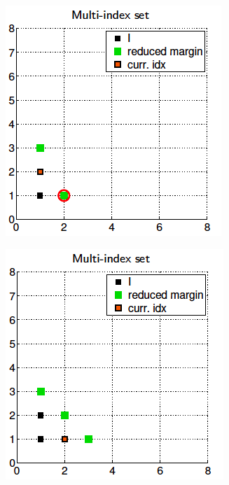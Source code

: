 \begin{figure}[htb]
\begin{subfigure}{0.165\textwidth}
 		\caption{}
 		\label{fig:4}
 	\end{subfigure}\hfil %
 	\begin{subfigure}{0.165\textwidth}
 		\includegraphics[width=\linewidth]{./figures/MISC_construction/5}
 		\caption{}
 		\label{fig:5}
 	\end{subfigure}\hfil %
 	\begin{subfigure}{0.165\textwidth}
 		\includegraphics[width=\linewidth]{./figures/MISC_construction/6}

\end{subfigure}
\end{figure}
